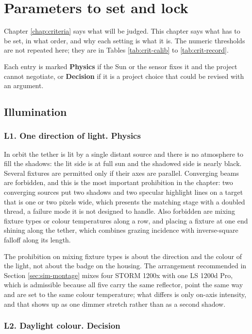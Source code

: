 \chapter{Parameters to set and lock}
\label{chap:parameters}

Chapter \ref{chap:criteria} says what will be judged. This chapter says what
has to be set, in what order, and why each setting is what it is. The numeric
thresholds are not repeated here; they are in Tables \ref{tab:crit-calib} to
\ref{tab:crit-record}.

Each entry is marked \textbf{Physics} if the Sun or the sensor fixes it and
the project cannot negotiate, or \textbf{Decision} if it is a project choice
that could be revised with an argument.

\section{Illumination}

\subsection*{L1. One direction of light. \textnormal{Physics}}

In orbit the tether is lit by a single distant source and there is no
atmosphere to fill the shadows: the lit side is at full sun and the shadowed
side is nearly black. Several fixtures are permitted only if their axes are
parallel. Converging beams are forbidden, and this is the most important
prohibition in the chapter: two converging sources put two shadows and two
specular highlight lines on a target that is one or two pixels wide, which
presents the matching stage with a doubled thread, a failure mode it is not
designed to handle. Also forbidden are mixing fixture types or colour
temperatures along a row, and placing a fixture at one end shining along the
tether, which combines grazing incidence with inverse-square falloff along
its length.

The prohibition on mixing fixture types is about the direction and the colour
of the light, not about the badge on the housing. The arrangement recommended
in Section \ref{sec:sim-montage} mixes four STORM 1200x with one LS 1200d
Pro, which is admissible because all five carry the same reflector, point the
same way and are set to the same colour temperature; what differs is only
on-axis intensity, and that shows up as one dimmer stretch rather than as a
second shadow.

\subsection*{L2. Daylight colour. \textnormal{Decision}}

